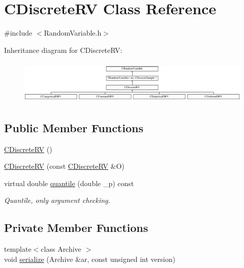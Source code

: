 \hypertarget{class_c_discrete_r_v}{\section{C\-Discrete\-R\-V Class Reference}
\label{class_c_discrete_r_v}
}


{\ttfamily \#include $<$Random\-Variable.\-h$>$}

Inheritance diagram for C\-Discrete\-R\-V\-:\begin{figure}[H]
\begin{center}
\leavevmode
\includegraphics[height=2.129278cm]{class_c_discrete_r_v}
\end{center}
\end{figure}
\subsection*{Public Member Functions}
\begin{DoxyCompactItemize}
\item 
\hyperlink{class_c_discrete_r_v_a28c2505cde535e593d34362568b8853e}{C\-Discrete\-R\-V} ()
\item 
\hyperlink{class_c_discrete_r_v_a1da806969129ba38e8d7a03a3ee1ae34}{C\-Discrete\-R\-V} (const \hyperlink{class_c_discrete_r_v}{C\-Discrete\-R\-V} \&O)
\item 
virtual double \hyperlink{class_c_discrete_r_v_ab85fc494d5a2e900d5b135673e2bd750}{quantile} (double \-\_\-p) const 
\begin{DoxyCompactList}\small\item\em Quantile, only argument checking. \end{DoxyCompactList}\end{DoxyCompactItemize}
\subsection*{Private Member Functions}
\begin{DoxyCompactItemize}
\item 
{\footnotesize template$<$class Archive $>$ }\\void \hyperlink{class_c_discrete_r_v_a312904d56674cb277a94c3ad045cc4b8}{serialize} (Archive \&ar, const unsigned int version)
\end{DoxyCompactItemize}
